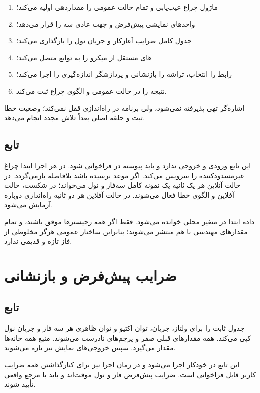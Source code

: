 \begin{enumerate}
  \item ماژول چراغ عیب‌یابی و تمام حالت عمومی را مقداردهی اولیه می‌کند؛
  \item واحدهای نمایشی پیش‌فرض و جهت عادی سه  را قرار می‌دهد؛
  \item جدول کامل ضرایب آغازکار  و جریان نول را بارگذاری می‌کند؛
  \item {}های مستقل از میکرو را به توابع  متصل می‌کند؛
  \item رابط  را انتخاب، تراشه را بازنشانی و پردازشگر اندازه‌گیری را اجرا می‌کند؛
  \item نتیجه را در حالت عمومی و الگوی چراغ ثبت می‌کند.
\end{enumerate}

اشاره‌گر تهی پذیرفته نمی‌شود، ولی برنامه در راه‌اندازی قفل نمی‌کند؛ وضعیت خطا ثبت و حلقه اصلی بعداً تلاش مجدد انجام می‌دهد.

\subsection{تابع }
این تابع ورودی و خروجی ندارد و باید پیوسته در
فراخوانی شود. در هر اجرا ابتدا چراغ غیرمسدودکننده را سرویس می‌کند. اگر موعد نرسیده باشد بلافاصله بازمی‌گردد. در حالت آنلاین هر یک ثانیه یک نمونه کامل سه‌فاز و نول می‌خواند؛ در شکست، حالت آفلاین و الگوی خطا فعال می‌شوند. در حالت آفلاین هر دو ثانیه راه‌اندازی دوباره آزمایش می‌شود.

داده ابتدا در متغیر محلی خوانده می‌شود. فقط اگر همه رجیسترها موفق باشند،  و تمام مقدارهای مهندسی با هم منتشر می‌شوند؛ بنابراین ساختار عمومی هرگز مخلوطی از فاز تازه و قدیمی ندارد.

\section{ضرایب پیش‌فرض و بازنشانی}

\subsection{تابع }
جدول ثابت
را برای ولتاژ، جریان، توان اکتیو و توان ظاهری هر سه فاز و جریان نول کپی می‌کند. همه مقدارهای قبلی صفر و پرچم‌های
نادرست می‌شوند. منبع همه خانه‌ها مقدار
می‌گیرد. سپس خروجی‌های نمایش نیز تازه می‌شوند.

این تابع در
خودکار اجرا می‌شود و در زمان اجرا نیز برای کنارگذاشتن همه ضرایب کاربر قابل فراخوانی است. ضرایب پیش‌فرض فاز
و نول موقت‌اند و باید با مرجع واقعی تأیید شوند.

